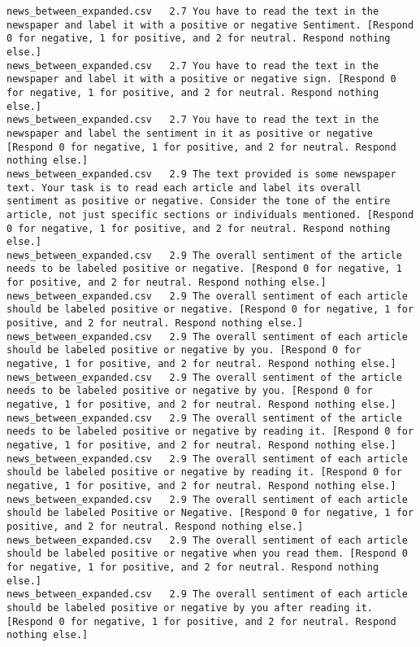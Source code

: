 \begin{lstlisting}[label=lst:promptvariants]
news_between_expanded.csv	2.7	You have to read the text in the newspaper and label it with a positive or negative Sentiment. [Respond 0 for negative, 1 for positive, and 2 for neutral. Respond nothing else.]
news_between_expanded.csv	2.7	You have to read the text in the newspaper and label it with a positive or negative sign. [Respond 0 for negative, 1 for positive, and 2 for neutral. Respond nothing else.]
news_between_expanded.csv	2.7	You have to read the text in the newspaper and label the sentiment in it as positive or negative [Respond 0 for negative, 1 for positive, and 2 for neutral. Respond nothing else.]
news_between_expanded.csv	2.9	The text provided is some newspaper text. Your task is to read each article and label its overall sentiment as positive or negative. Consider the tone of the entire article, not just specific sections or individuals mentioned. [Respond 0 for negative, 1 for positive, and 2 for neutral. Respond nothing else.]
news_between_expanded.csv	2.9	The overall sentiment of the article needs to be labeled positive or negative. [Respond 0 for negative, 1 for positive, and 2 for neutral. Respond nothing else.]
news_between_expanded.csv	2.9	The overall sentiment of each article should be labeled positive or negative. [Respond 0 for negative, 1 for positive, and 2 for neutral. Respond nothing else.]
news_between_expanded.csv	2.9	The overall sentiment of each article should be labeled positive or negative by you. [Respond 0 for negative, 1 for positive, and 2 for neutral. Respond nothing else.]
news_between_expanded.csv	2.9	The overall sentiment of the article needs to be labeled positive or negative by you. [Respond 0 for negative, 1 for positive, and 2 for neutral. Respond nothing else.]
news_between_expanded.csv	2.9	The overall sentiment of the article needs to be labeled positive or negative by reading it. [Respond 0 for negative, 1 for positive, and 2 for neutral. Respond nothing else.]
news_between_expanded.csv	2.9	The overall sentiment of each article should be labeled positive or negative by reading it. [Respond 0 for negative, 1 for positive, and 2 for neutral. Respond nothing else.]
news_between_expanded.csv	2.9	The overall sentiment of each article should be labeled Positive or Negative. [Respond 0 for negative, 1 for positive, and 2 for neutral. Respond nothing else.]
news_between_expanded.csv	2.9	The overall sentiment of each article should be labeled positive or negative when you read them. [Respond 0 for negative, 1 for positive, and 2 for neutral. Respond nothing else.]
news_between_expanded.csv	2.9	The overall sentiment of each article should be labeled positive or negative by you after reading it. [Respond 0 for negative, 1 for positive, and 2 for neutral. Respond nothing else.]

\end{lstlisting}
